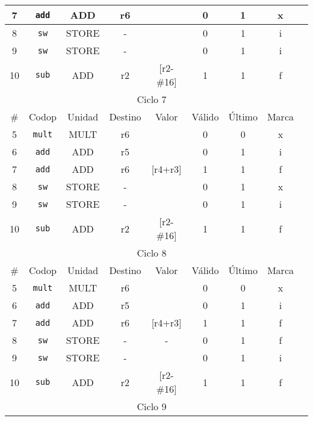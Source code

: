 \begin{ejercicio}
\begin{table}[H]
\begin{tabular}{|c|c|c|c|c|c|c|c|c|}
            7  & \verb|add| & ADD    & r6      &       & 0      & 1      & x     \\ \hline
            8  & \verb|sw|  & STORE  & -       &       & 0      & 1      & i     \\ \hline
            9  & \verb|sw|  & STORE  & -       &       & 0      & 1      & i     \\ \hline
            10 & \verb|sub| & ADD    & r2      & [r2-\#16] & 1  & 1      & f     \\ \hline\hline
            \multicolumn{8}{|c|}{Ciclo 7} \\
            \hline
            \# & Codop      & Unidad & Destino & Valor & Válido & Último & Marca \\ \hline
            5  & \verb|mult|& MULT   & r6      &       & 0      & 0      & x     \\ \hline
            6  & \verb|add| & ADD    & r5      &       & 0      & 1      & i     \\ \hline
            7  & \verb|add| & ADD    & r6      & [r4+r3]  & 1   & 1      & f     \\ \hline
            8  & \verb|sw|  & STORE  & -       &       & 0      & 1      & x     \\ \hline
            9  & \verb|sw|  & STORE  & -       &       & 0      & 1      & i     \\ \hline
            10 & \verb|sub| & ADD    & r2      & [r2-\#16] & 1  & 1      & f     \\ \hline\hline
            \multicolumn{8}{|c|}{Ciclo 8} \\
            \hline
            \# & Codop      & Unidad & Destino & Valor & Válido & Último & Marca \\ \hline
            5  & \verb|mult|& MULT   & r6      &       & 0      & 0      & x     \\ \hline
            6  & \verb|add| & ADD    & r5      &       & 0      & 1      & i     \\ \hline
            7  & \verb|add| & ADD    & r6      & [r4+r3]  & 1   & 1      & f     \\ \hline
            8  & \verb|sw|  & STORE  & -       & -     & 0      & 1      & f     \\ \hline
            9  & \verb|sw|  & STORE  & -       &       & 0      & 1      & i     \\ \hline
            10 & \verb|sub| & ADD    & r2      & [r2-\#16] & 1  & 1      & f     \\ \hline\hline
            \multicolumn{8}{|c|}{Ciclo 9} \\

\end{tabular}
\end{table}
\end{ejercicio}
